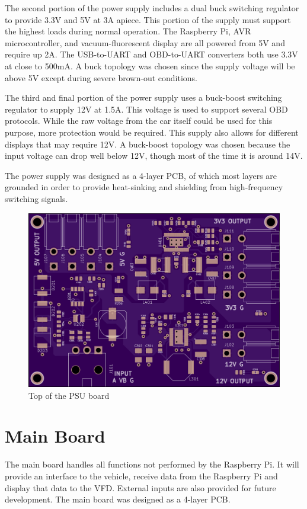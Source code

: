 The second portion of the power supply includes a dual buck switching regulator
to provide 3.3V and 5V at 3A apiece.  This portion of the supply must support 
the highest loads during normal operation.  The Raspberry Pi, AVR 
microcontroller, and vacuum-fluorescent display are all powered from 5V and 
require up 2A.  The USB-to-UART \cite{ft2232hds} and OBD-to-UART \cite{stn1110ds} converters both use 3.3V at 
close to 500mA.  A buck topology was chosen since the supply voltage will be
above 5V except during severe brown-out conditions.

The third and final portion of the power supply uses a buck-boost switching
regulator \cite{ltc3115ds} to supply 12V at 1.5A.  This voltage is used to support several
OBD protocols.  While the raw voltage from the car itself could be used
for this purpose, more protection would be required.  This supply also allows
for different displays that may require 12V.  A buck-boost topology was chosen
because the input voltage can drop well below 12V, though most of the time it is
around 14V.

The power supply was designed as a 4-layer PCB, of which most layers are grounded 
in order to provide heat-sinking and shielding from high-frequency switching signals.

\begin{figure}[h]
\includegraphics[width=\textwidth]{img/psu_render_top.png}
\caption{Top of the PSU board}
\label{fig:psu render}
\end{figure}

\section{Main Board}
The main board handles all functions not performed by the Raspberry Pi.  It will
provide an interface to the vehicle, receive data from the Raspberry Pi and 
display that data to the VFD.  External inputs are also provided for future 
development.  The main board was designed as a 4-layer PCB.

